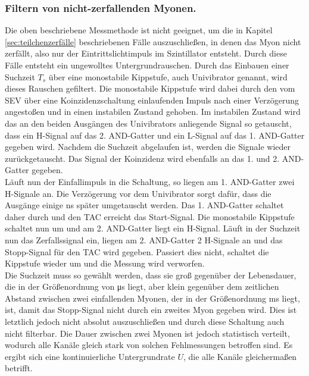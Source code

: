 \documentclass[
  bibliography=totoc,     %
  captions=tableheading,  %
  titlepage=firstiscover, %
]{scrartcl}
\begin{document}
  \subsubsection{Filtern von nicht-zerfallenden Myonen.}
  Die oben beschriebene Messmethode ist nicht geeignet, um die in Kapitel
  \ref{sec:teilchenzerfälle} beschriebenen Fälle auszuschließen, in denen das Myon
  nicht zerfällt, also nur der Eintrittslichtimpuls im Szintillator entsteht.
  Durch diese Fälle entsteht ein ungewolltes Untergrundrauschen. Durch das
  Einbauen einer Suchzeit $T_s$ über eine monostabile
  Kippstufe, auch Univibrator genannt, wird dieses Rauschen gefiltert. Die
  monostabile Kippstufe wird dabei durch den vom SEV über eine Koinzidenzschaltung einlaufenden
  Impuls nach einer Verzögerung angestoßen und in einen instabilen Zustand gehoben.
  Im instabilen Zustand wird das an den beiden Ausgängen des Univibrators anliegende Signal so
  getauscht, dass ein H-Signal auf das 2. AND-Gatter und ein L-Signal auf das 1. AND-Gatter
  gegeben wird. Nachdem die Suchzeit abgelaufen ist, werden die Signale wieder zurückgetauscht.
  Das Signal der Koinzidenz wird ebenfalls an das 1. und 2. AND-Gatter gegeben.\\
  Läuft nun der Einfallimpuls in die Schaltung, so liegen am 1. AND-Gatter zwei
  H-Signale an. Die Verzögerung vor dem Univibrator sorgt dafür, dass die Ausgänge einige
  \si{\nano\second} später umgetauscht werden. Das 1. AND-Gatter schaltet daher durch
  und den TAC erreicht das Start-Signal. Die monostabile Kippstufe schaltet nun um
  und am 2. AND-Gatter liegt ein H-Signal. Läuft in der Suchzeit nun das Zerfallssignal
  ein, liegen am 2. AND-Gatter 2 H-Signale an und das Stopp-Signal für den TAC wird gegeben.
  Passiert dies nicht, schaltet die Kippstufe wieder um und die Messung wird verworfen.\\
  Die Suchzeit muss so gewählt werden, dass sie groß gegenüber der Lebensdauer, die in der Größenordnung
  von \si{\micro\second} liegt, aber klein
  gegenüber dem zeitlichen Abstand zwischen zwei einfallenden Myonen, der in der
  Größenordnung \si{\milli\second} liegt, ist, damit das
  Stopp-Signal nicht durch ein zweites Myon gegeben wird. Dies ist letztlich jedoch nicht absolut
  auszuschließen und durch diese Schaltung auch nicht filterbar. Die Dauer zwischen
  zwei Myonen ist jedoch statistisch verteilt, wodurch alle Kanäle gleich stark von
  solchen Fehlmessungen betroffen sind. Es ergibt sich eine kontinuierliche Untergrundrate $U$,
  die alle Kanäle gleichermaßen betrifft.
\end{document}
